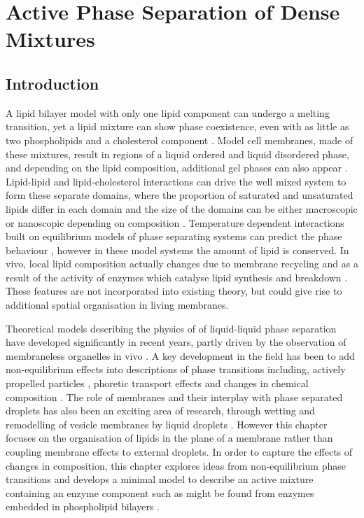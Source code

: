 \chapter{\label{ch:2-draft}Active Phase Separation of Dense Mixtures}

\minitoc
\newpage

\section{Introduction}

A lipid bilayer model with only one lipid component can undergo a melting transition, yet a lipid mixture can show phase coexistence, even with as little as two phospholipids and a cholesterol component \cite{elson_phase_2010}. Model cell membranes, made of these mixtures, result in regions of a liquid ordered and liquid disordered phase, and depending on the lipid composition, additional gel phases can also appear \cite{sych_how_2021, aufderhorst-roberts_three-phase_2017}. Lipid-lipid and lipid-cholesterol interactions can drive the well mixed system to form these separate domains, where the proportion of saturated and unsaturated lipids differ in each domain and the size of the domains can be either macroscopic or nanoscopic depending on composition \cite{feigenson_phase_2009}. Temperature dependent interactions built on equilibrium models of phase separating systems can predict the phase behaviour \cite{wolff_thermodynamic_2011}, however in these model systems the amount of lipid is conserved. In vivo, local lipid composition actually changes due to membrane recycling and as a result of the activity of enzymes which catalyse lipid synthesis and breakdown \cite{feigenson_phase_2009}. These features are not incorporated into existing theory, but could give rise to additional spatial organisation in living membranes.

Theoretical models describing the physics of of liquid-liquid phase separation have developed significantly in recent years, partly driven by the observation of membraneless organelles in vivo \cite{shin_liquid_2017}. A key development in the field has been to add non-equilibrium effects into descriptions of phase transitions including, actively propelled particles \cite{cates_motility-induced_2015}, phoretic transport effects \cite{agudo-canalejo_active_2019} and changes in chemical composition \cite{weber_drops_2021, li_non-equilibrium_2020}. The role of membranes and their interplay with phase separated droplets has also been an exciting area of research, through wetting and remodelling of vesicle membranes by liquid droplets \cite{mangiarotti_wetting_2023}. However this chapter focuses on the organisation of lipids in the plane of a membrane rather than coupling membrane effects to external droplets. In order to capture the effects of changes in composition, this chapter explores ideas from non-equilibrium phase transitions and develops a minimal model to describe an active mixture containing an enzyme component such as might be found from enzymes embedded in phospholipid bilayers \cite{alberts_molecular_2008}.

